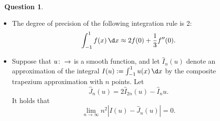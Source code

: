 \documentclass[10pt]{article}
\theoremstyle{definition}
\newtheorem{question}{{\normalfont \faGears}~Question}
\theoremstyle{remark}
\begin{document}
\begin{question}
\begin{enumerate}
\begin{itemize}
                \item
                    The degree of precision of the following integration rule is 2:
                    \[
                        \int_{-1}^{1} f(x) \, \d x \approx
                        2 f(0) + \frac{1}{3} f''(0).
                    \]

                \item
                    Suppose that $u \colon \real \to \real$ is a smooth function,
                    and let $\widehat I_n(u)$ denote an approximation of
                    the integral $I(u) := \int_{-1}^{1} u(x) \, \d x$
                    by the composite trapezium approximation with $n$ points.
                    Let
                    \[
                        \widehat J_n(u) = 2 \widehat I_{2n}(u) - \widehat I_n{u}.
                    \]
                    It holds that
                    \[
                        \lim_{n \to \infty} n^2 \left\lvert I(u) - \widehat J_n(u) \right\rvert
                        = 0.
                    \]
            \end{itemize}

    \end{enumerate}
\end{question}
\end{document}
